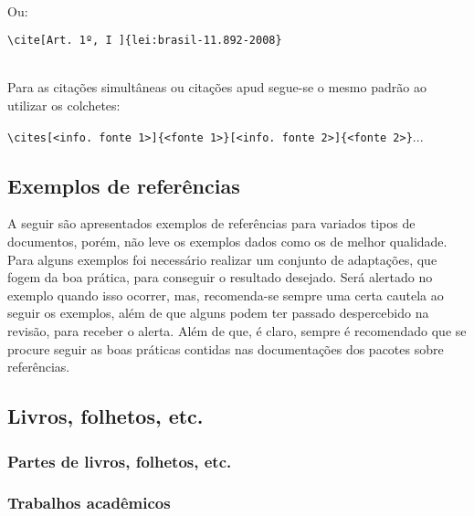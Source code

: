\textcite[p. 239]{livro:dom-casmurro}\\

Ou:

\verb|\cite[Art. 1º, I ]{lei:brasil-11.892-2008}|

\cite[Art. 1º, I ]{lei:brasil-11.892-2008}\\

Para as citações simultâneas ou citações apud segue-se o mesmo padrão ao utilizar os colchetes:

\verb|\cites[<info. fonte 1>]{<fonte 1>}[<info. fonte 2>]{<fonte 2>}|...

\subsection{Exemplos de referências}
A seguir são apresentados exemplos de referências para variados tipos de documentos, porém, não leve os exemplos dados como os de melhor qualidade. Para alguns exemplos foi necessário realizar um conjunto de adaptações, que fogem da boa prática, para conseguir o resultado desejado. Será alertado no exemplo quando isso ocorrer, mas, recomenda-se sempre uma certa cautela ao seguir os exemplos, além de que alguns podem ter passado despercebido na revisão, para receber o alerta. Além de que, é claro, sempre é recomendado que se procure seguir as boas práticas contidas nas documentações dos pacotes sobre referências.

\subsection{Livros, folhetos, etc.}




\subsubsection{Partes de livros, folhetos, etc.}



\subsubsection{Trabalhos acadêmicos}

